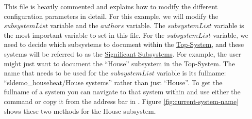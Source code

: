 \documentclass{mcscert}
\newcommand{\topsystemnolink}{Top-System} %
\newcommand{\topsystem}{\hyperref[def:topsystem]{\topsystemnolink{}}}
\newcommand{\sigsubsnolink}{Significant Subsystems} %
\newcommand{\sigsubs}{\hyperref[def:sigsubs]{\sigsubsnolink{}}}
\begin{document}
This file is heavily commented and explains how to modify the different configuration parameters in detail. 
For this example, we will modify the $subsystemList$ variable and the $authors$ variable. The $subsystemList$ variable is the most important variable to set in this file. 
For the $subsystemList$ variable, we need to decide which subsystems to document within the \topsystem{}, and these systems will be referred to as the \sigsubs{}. 
For example, the user might just want to document the ``House'' subsystem in the \topsystem{}. 
The name that needs to be used for the $subsystemList$ variable is its fullname: ``sldemo\_househeat/House systems'' rather than just ``House''. 
To get the fullname of a system you can navigate to that system within \simulink{} and use either the  command or copy it from the address bar in \simulink{}. 
Figure \ref{fig:current-system-name} shows these two methods for the House subsystem.
\end{document}
